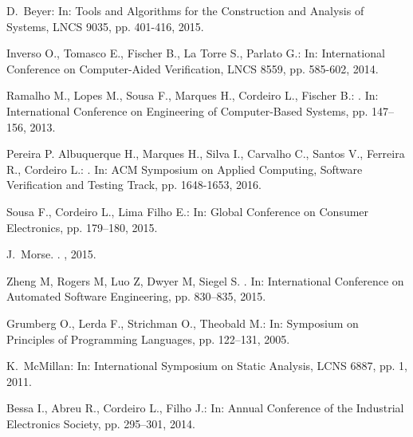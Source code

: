 \documentclass{acm_sen_article}
\begin{document}
{{\begin{thebibliography}{1}
D.~Beyer:
\newblock In: Tools and Algorithms for the Construction and Analysis of Systems, LNCS 9035, pp. 401-416, 2015.

Inverso O., Tomasco E., Fischer B., La Torre S., Parlato G.:
\newblock In: International Conference on Computer-Aided Verification, LNCS 8559, pp. 585-602, 2014.

Ramalho M., Lopes M., Sousa F., Marques H., Cordeiro L., Fischer B.:
.
\newblock In: International Conference on Engineering of Computer-Based Systems, pp. 147--156, 2013.

Pereira P.  Albuquerque H., Marques H., Silva I., Carvalho C., Santos V., Ferreira R., Cordeiro L.: 
.
\newblock In: ACM Symposium on Applied Computing, Software Verification and Testing Track, pp. 1648-1653, 2016. 

Sousa F., Cordeiro L., Lima Filho E.: 
\newblock In: Global Conference on Consumer Electronics, pp. 179--180, 2015.

J.~Morse.
.
, 2015.

Zheng M, Rogers M, Luo Z, Dwyer M, Siegel S.
.
\newblock In: International Conference on Automated Software Engineering, pp. 830--835, 2015.

Grumberg O., Lerda F., Strichman O., Theobald M.:
\newblock In: Symposium on Principles of Programming Languages, pp. 122--131, 2005.

K.~McMillan:
\newblock In: International Symposium on Static Analysis, LCNS 6887, pp. 1, 2011.

Bessa I., Abreu R., Cordeiro L., Filho J.:
\newblock In: Annual Conference of the Industrial Electronics Society, pp. 295--301, 2014.


\end{thebibliography}}}
\end{document}
